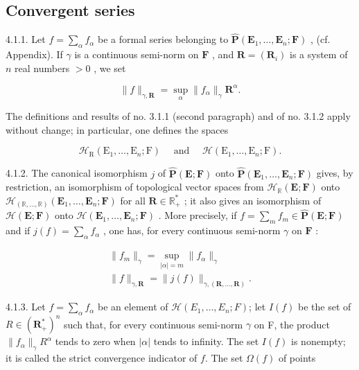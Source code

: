 \subsection{Convergent series}

4.1.1. Let \(f = \sum_{\alpha} f_{\alpha}\) be a formal series belonging to \(\hat{\mathbf{P}}(\mathbf{E}_1, \ldots, \mathbf{E}_n; \mathbf{F})\) , (cf. Appendix). If \(\gamma\) is a continuous semi-norm on \(\mathbf{F}\) , and \(\mathbf{R} = (\mathbf{R}_i)\) is a system of \(n\) real numbers \(>0\) , we set

\[
\| f \| _ {\gamma , \mathbf {R}} = \sup _ {\alpha} \| f _ {\alpha} \| _ {\gamma} \mathbf {R} ^ {\alpha}.
\]

The definitions and results of no. 3.1.1 (second paragraph) and of no. 3.1.2 apply without change; in particular, one defines the spaces

\[
\mathcal {H} _ {\mathrm{R}} (\mathrm{E} _ {1}, \dots , \mathrm{E} _ {n}; \mathrm{F}) \quad \text { and } \quad \mathcal {H} (\mathrm{E} _ {1}, \dots , \mathrm{E} _ {n}; \mathrm{F}).
\]

4.1.2. The canonical isomorphism \(j\) of \(\hat{\mathbf{P}}(\mathbf{E};\mathbf{F})\) onto \(\hat{\mathbf{P}}(\mathbf{E}_{1},\ldots,\mathbf{E}_{n};\mathbf{F})\) gives, by restriction, an isomorphism of topological vector spaces from \(\mathcal{H}_{\mathbb{R}}(\mathbf{E};\mathbf{F})\) onto \(\mathcal{H}_{(\mathbb{R},\ldots,\mathbb{R})}(\mathbf{E}_{1},\ldots,\mathbf{E}_{n};\mathbf{F})\) for all \(\mathbf{R}\in\mathbb{R}_{+}^{*}\) ; it also gives an isomorphism of \(\mathcal{H}(\mathbf{E};\mathbf{F})\) onto \(\mathcal{H}(\mathbf{E}_{1},\ldots,\mathbf{E}_{n};\mathbf{F})\) . More precisely, if \(f=\sum_{m}f_{m}\in\hat{\mathbf{P}}(\mathbf{E};\mathbf{F})\) and if \(j(f)=\sum_{\alpha}f_{\alpha}\) , one has, for every continuous semi-norm \(\gamma\) on \(\mathbf{F}\) :

\[
\begin{array}{l} \| f _ {m} \| _ {\gamma} = \sup _ {| \alpha | = m} \| f _ {\alpha} \| _ {\gamma} \\ \| f \| _ {\gamma , \mathbf {R}} = \| j (f) \| _ {\gamma , (\mathbf {R}, \dots , \mathbf {R})}. \end{array}
\]

4.1.3. Let \(f = \sum_{\alpha} f_{\alpha}\) be an element of \(\mathcal{H}(E_1, \ldots, E_n; F)\); let \(I(f)\) be the set of \(R \in (\mathbf{R}_+^*)^n\) such that, for every continuous semi-norm \(\gamma\) on F, the product \(\|f_{\alpha}\|_{\gamma} R^{\alpha}\) tends to zero when \(|\alpha|\) tends to infinity. The set \(I(f)\) is nonempty; it is called the strict convergence indicator of \(f\). The set \(\Omega(f)\) of points

